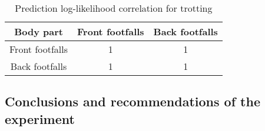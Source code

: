 \begin{table}[h!] 
	\centering
	\begin{tabular}{ |c|c|c|} 	
		\hline	
		\textbf{Body part} & \textbf{Front footfalls} &  \textbf{Back footfalls}\\ 
		\hline
		Front footfalls & 1 & 1\\ 
		\hline
		Back footfalls & 1 & 1\\ 
		\hline	   	
	\end{tabular}
	\caption{Prediction log-likelihood correlation for trotting}
	\label{tab:front-back-trot-log-corr}
\end{table}

\subsection{Conclusions and recommendations of the experiment}